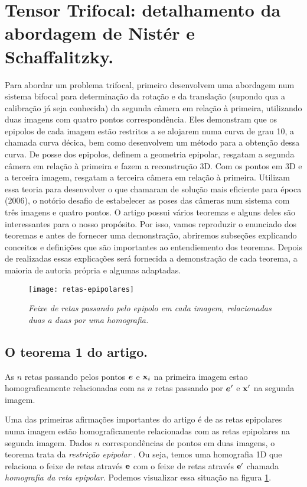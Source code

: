 \section{Tensor Trifocal: detalhamento da abordagem de Nistér e Schaffalitzky.}

Para abordar um problema trifocal, primeiro \cite{2503343} desenvolvem uma abordagem num sistema bifocal para determinação da rotação e da translação (supondo qua a calibração já seja conhecida) da segunda câmera em relação à primeira, utilizando duas imagens com quatro pontos correspondência. Eles demonstram que os epipolos de cada imagem estão restritos a se alojarem numa curva de grau 10, a chamada curva décica, bem como desenvolvem um método para a obtenção dessa curva. De posse dos epipolos, definem a geometria epipolar, resgatam a segunda câmera em relação à primeira e fazem a reconstrução 3D. Com os pontos em 3D e a terceira imagem, resgatam a terceira câmera em relação à primeira. Utilizam essa teoria para desenvolver o que chamaram de solução mais eficiente para época (2006), o notório desafio de estabelecer as poses das câmeras num sistema com três imagens e quatro pontos. O artigo possui vários teoremas e alguns deles são interessantes para o nosso propósito. Por isso, vamos reproduzir o enunciado dos teoremas e antes de fornecer uma demonstração, abriremos subseções explicando conceitos e definições que são importantes ao entendiemento dos teoremas. Depois de realizadas essas explicações será fornecida a demonstração de cada teorema, a maioria de autoria própria e algumas adaptadas.

\begin{figure}[!htb]
\centering
\texttt{[image: retas-epipolares]}
\caption{\textit{Feixe de retas passando pelo epipolo em cada imagem, relacionadas duas a duas por uma homografia.}}
\label{retas-epipolares}
\end{figure}

\subsection{O teorema 1 do artigo.}\label{sec.homografia-reta-epipolar} 


\begin{teorema}
As $n$ retas passando pelos pontos $\boldsymbol{e}$ e $\mathbf{x}_i$ na primeira imagem estao homograficamente relacionadas com as $n$ retas passando por $\boldsymbol{e}'$ e $\mathbf{x}'$ na segunda imagem.
\end{teorema}

Uma das primeiras afirmações importantes do artigo é de as retas epipolares numa imagem estão homograficamente relacionadas com as retas epipolares na segunda imagem. Dados $n$ correspondências de pontos em duas imagens, o teorema trata da \textit{restrição epipolar} \citep{faugeras93three}. Ou seja, temos uma homografia 1D que relaciona o feixe de retas através ${\bf e}$ com o feixe de retas através ${\bf e'}$ chamada \textit{homografia da reta epipolar}. Podemos visualizar essa situação na figura \ref{retas-epipolares}.

